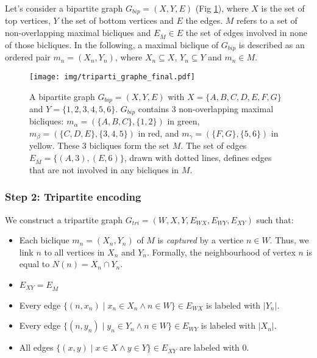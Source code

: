 \documentclass[table]{report}
\begin{document}
Let's consider a bipartite graph $G_{bip}=(X,Y,E)$ (Fig \ref{fig:triparti_graphe_exemple}), where $X$ is the set of top vertices, $Y$ the set of bottom vertices and $E$ the edges. $M$ refers to a set of non-overlapping maximal bicliques and $E_{\overline{M}} \in E$ the set of edges involved in none of those bicliques. In the following, a maximal biclique of $G_{bip}$ is described as an ordered pair $ m_n = (X_n,Y_n)$, where $X_n \subseteq X$, $Y_n \subseteq Y$ and $m_n \in M$. 
  

\begin{figure}[h]%
\centering
\texttt{[image: img/triparti\_graphe\_final.pdf]}
\caption{A bipartite graph $G_{bip} = (X,Y,E)$ with $X = \{A,B,C,D,E,F,G\}$ and $Y= \{1,2,3,4,5,6\}$. $G_{bip}$ contains 3 non-overlapping maximal bicliques: 
$m_\alpha = (\{A,B,C\}, \{1,2\})$ in green,  
$m_\beta = (\{C,D,E\}, \{3,4,5\})$ in red, 
and $m_\gamma = (\{F,G\}, \{5,6\})$ in yellow. These 3 bicliques form the set $M$. 
The set of edges $E_{\overline{M}} = \{(A,3),(E,6)\}$, drawn with dotted lines, defines edges that are not involved in any bicliques in $M$.}
\label{fig:triparti_graphe_exemple}
\end{figure}
\FloatBarrier


\subsubsection{Step 2: Tripartite encoding}

\noindent
We construct a tripartite graph $G_{tri}=(W,X,Y,E_{WX},E_{WY},E_{XY} )$ such that:
\begin{itemize}[noitemsep]
\item Each biclique $m_n = (X_n, Y_n)$ of $M$ is \textit{captured} by a vertice $n \in W$. Thus, we link $n$ to all vertices in $X_n$ and $Y_n$. Formally, the neighbourhood of vertex $n$ is equal to $N(n) = X_n \cap Y_n$. 
\item $E_{XY} = E_{\overline{M}}$
\item Every edge $\{(n, x_n) \mid x_n \in X_n \wedge n \in W\} \in E_{WX}$ is labeled with $|Y_n|$.
\item Every edge $\{(n, y_n) \mid y_n \in Y_n \wedge n \in W\} \in E_{WY}$ is labeled with $|X_n|$.
\item All edges $\{(x, y) \mid x \in X \wedge y \in Y \} \in E_{XY}$ are labeled with 0.
\end{itemize}

\end{document}
